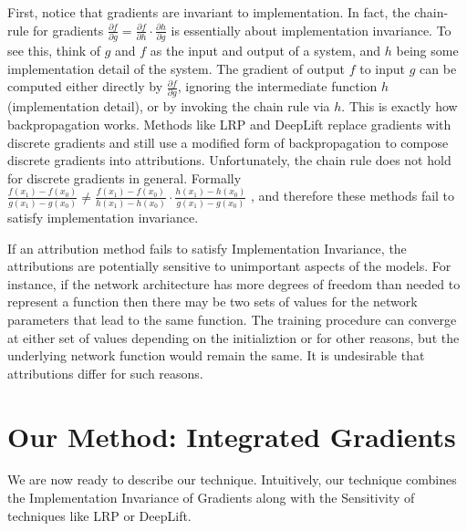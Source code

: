 First, notice that gradients are invariant to implementation.
In fact, the chain-rule for
gradients $\frac{\partial f}{\partial g}=\frac{\partial f}{\partial
  h}\cdot \frac{\partial h}{\partial g}$ is essentially about
implementation invariance. To see this, think of $g$ and $f$ as the input
and output of a system, and $h$ being some implementation detail of the
system.  The gradient of output $f$ to input $g$
can be computed either directly by $\frac{\partial f}{\partial g}$,
ignoring the intermediate function $h$ (implementation detail), or by
invoking the chain rule via $h$. This is exactly how backpropagation works.
Methods like LRP and DeepLift replace gradients with discrete
gradients and still use a modified form of backpropagation to compose
discrete gradients into attributions.
Unfortunately, the chain rule does not hold for discrete gradients in
general. Formally
$\frac{f(x_1)-f(x_0)}{g(x_1)-g(x_0)}\neq\frac{f(x_1)-f(x_0)}{h(x_1)-h(x_0)}\cdot\frac{h(x_1)-h(x_0)}{g(x_1)-g(x_0)}$
, and therefore these methods fail to satisfy implementation invariance.

If an attribution method fails to satisfy Implementation Invariance,
the attributions are potentially sensitive to unimportant aspects of
the models.
For instance, if the network architecture has more degrees of freedom
than needed to represent a function then there may be two sets of values
for the network parameters that lead to the same function.
The training procedure can converge at either set of values depending
on the initializtion or for other reasons, but the underlying network
function would remain the same. It is undesirable that attributions differ
for such reasons.


\section{Our Method: Integrated Gradients}
\label{sec:method}


We are now ready to describe our technique. Intuitively, our technique
combines the Implementation Invariance of Gradients along with the Sensitivity
of techniques like LRP or DeepLift.


